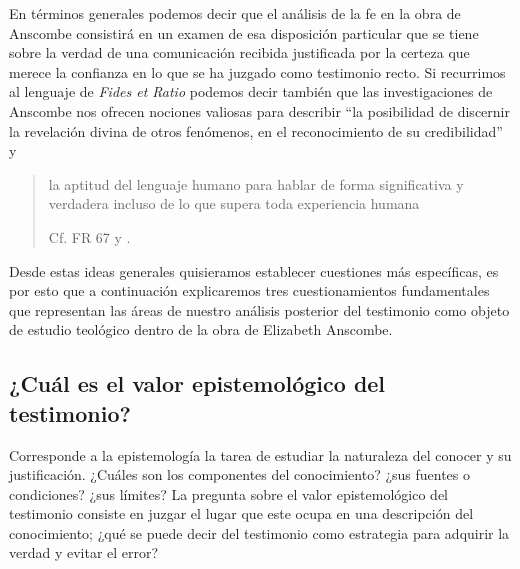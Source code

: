 \label{subsec:aptitud}
En términos generales podemos decir que el análisis de la fe en la obra de Anscombe consistirá en un examen de esa disposición particular que se tiene sobre la verdad de una comunicación recibida justificada por la certeza que merece la confianza en lo que se ha juzgado como testimonio recto. Si recurrimos al lenguaje de \emph{Fides et Ratio} podemos decir también que las investigaciones de Anscombe nos ofrecen nociones valiosas para describir \enquote{la posibilidad de discernir la revelación divina de otros fenómenos, en el reconocimiento de su credibilidad} y \blockquote[{Cf. FR 67 y \Cite[198-201]{ninot2009tf}}.]{la aptitud del lenguaje humano para hablar de forma significativa y verdadera incluso de lo que supera toda experiencia humana}. Desde estas ideas generales quisieramos establecer cuestiones más específicas, es por esto que a continuación explicaremos tres cuestionamientos fundamentales que representan las áreas de nuestro análisis posterior del testimonio como objeto de estudio teológico dentro de la obra de Elizabeth Anscombe.

\subsection{¿Cuál es el valor epistemológico del testimonio?}

Corresponde a la epistemología la tarea de estudiar la naturaleza del conocer y su justificación. ¿Cuáles son los componentes del conocimiento? ¿sus fuentes o condiciones? ¿sus límites? La pregunta sobre el valor epistemológico del testimonio consiste en juzgar el lugar que este ocupa en una descripción del conocimiento; ¿qué se puede decir del testimonio como estrategia para adquirir la verdad y evitar el error?

